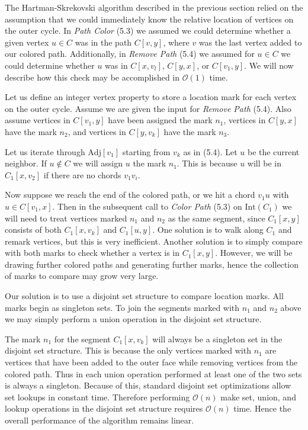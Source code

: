 \documentclass[letterpaper, 12pt]{article}
\theoremstyle{definition}
\theoremstyle{definition}
\theoremstyle{thm}
\theoremstyle{definition}
\begin{document}
The Hartman-Skrekovski algorithm described in the previous section relied on the
assumption that we could immediately
know the relative location of vertices on the outer cycle. In
\textit{Path Color} (5.3) we assumed we could determine
whether a given vertex $u\in C$ was in the path $C[v,y]$, where $v$ was the
last vertex added to our colored path. Additionally, in \textit{Remove Path}
(5.4) we assumed for $u\in C$ we could determine whether $u$ was in $C[x,v_l]$,
$C[y,x]$, or $C[v_1,y]$. We will now describe how this check may be accomplished
in $\mathcal{O}(1)$ time.

Let us define an integer vertex property to store a location mark for each
vertex on the outer cycle. Assume we are given the input for \textit{Remove
Path} (5.4). Also assume vertices in $C[v_1,y]$ have been assigned the mark $n_1$,
vertices in $C[y,x]$ have the mark $n_2$, and vertices in $C[y,v_k]$ have
the mark $n_3$.

Let us iterate through $\text{Adj}[v_1]$ starting from $v_k$ as in (5.4). Let
$u$ be the current neighbor. If $u\not\in C$ we will assign $u$ the mark $n_1$.
This is because $u$ will be in $C_1[x,v_2]$ if there are no chords $v_1v_i$.

Now suppose we reach the end of the colored path, or we hit a chord $v_1u$ with
$u\in C[v_1,x]$. Then in the subsequent call to \textit{Color Path} (5.3) on
$\text{Int}(C_1)$ we will need to treat vertices marked $n_1$ and $n_2$ as the
same segment, since $C_1[x,y]$ consists of both $C_1[x,v_k]$ and $C_1[u,y]$.
One solution is to walk along $C_1$ and remark vertices, but this is very
inefficient. Another solution is to simply compare with both marks to check
whether a vertex is in $C_1[x,y]$. However, we will be drawing further colored
paths and generating further marks, hence the collection of marks to compare
may grow very large.

Our solution is to use a disjoint set structure to compare location marks. All
marks begin as singleton sets. To join the segments marked with $n_1$ and
$n_2$ above we may simply perform a union operation in the disjoint set structure.

The mark $n_1$ for the segment $C_1[x,v_k]$ will always be a singleton set in the
disjoint set structure. This is because the only vertices marked with $n_1$ are
vertices that have been added to the outer face while removing vertices from the
colored path. Thus in each union operation performed at least one of the two sets
is always a singleton. Because of this, standard disjoint set optimizations
allow set lookups in constant time. Therefore performing
$\mathcal{O}(n)$ make set, union, and lookup operations in the disjoint set
structure requires $\mathcal{O}(n)$ time. Hence the overall performance of the
algorithm remains linear.
\end{document}
